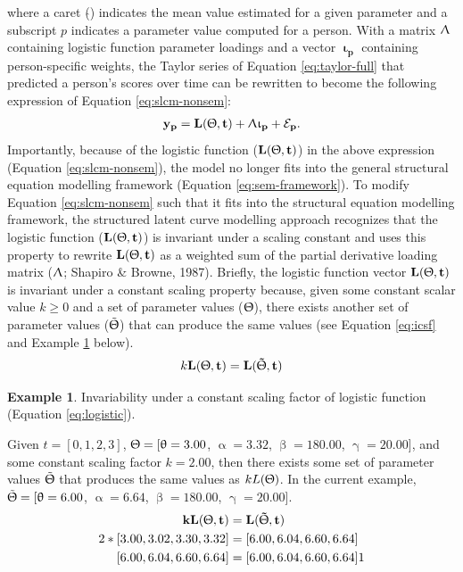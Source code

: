 \documentclass[
12pt, %
twoside,
english]{guelphthesis}
\theoremstyle{definition}
\theoremstyle{definition}
\newtheorem{example}{Example}[chapter]
\theoremstyle{definition}
\theoremstyle{definition}
\theoremstyle{remark}
\begin{document}
\noindent where a caret (\(\hat{}\)) indicates the mean value estimated
for a given parameter and a subscript \(p\) indicates a parameter value
computed for a person. With a matrix \(\mathbf{\Uplambda}\) containing
logistic function parameter loadings and a vector \(\mathbf{\upiota_p}\) containing
person-specific weights, the Taylor series of Equation
\ref{eq:taylor-full} that predicted a person's scores over time can be
rewritten to become the following expression of Equation
\ref{eq:slcm-nonsem}:
\begin{align}
 \mathbf{y_p} = \mathbf{L(\Uptheta, t)} + \mathbf{\Uplambda\upiota_p} + \mathbf{\mathcal{E}_p}.
 \label{eq:slcm-nonsem}
\end{align}
\noindent Importantly, because of the logistic function (\(\mathbf{L(\Uptheta, t)}\)) in the
above expression (Equation \ref{eq:slcm-nonsem}), the model no longer
fits into the general structural equation modelling framework (Equation \ref{eq:sem-framework}). To modify Equation \ref{eq:slcm-nonsem} such that it fits into the structural equation modelling framework, the structured latent curve modelling approach recognizes that the logistic function (\(\mathbf{L(\Uptheta, t)}\)) is invariant under a scaling constant and uses this property to rewrite \(\mathbf{L(\Uptheta, t)}\) as a weighted sum of the partial derivative loading matrix (\(\mathbf{\Uplambda}\); Shapiro \& Browne, 1987). Briefly, the
logistic function vector \(\mathbf{L(\Uptheta, t)}\) is invariant under a constant scaling
property because, given some constant scalar value \(k \ge 0\) and a set
of parameter values (\(\Uptheta\)), there exists another set of parameter
values (\(\tilde{\Uptheta}\)) that can produce the same values (see
Equation \ref{eq:icsf} and Example \ref{exm:icsf-ex} below).
\begin{align}
 k\mathbf{L(\Uptheta, t)} = \mathbf{L(\tilde{\Uptheta}, t)}
 \label{eq:icsf}
\end{align}
\begin{example}
\protect\hypertarget{exm:icsf-ex}{}\label{exm:icsf-ex}Invariability under a constant scaling factor of logistic function (Equation \ref{eq:logistic}).

\noindent \textup{Given $t = [0, 1, 2, 3]$, $\Uptheta = [\uptheta = 3.00$, $\upalpha = 3.32$, $\upbeta = 180.00$, $\upgamma = 20.00$], and some constant scaling factor $k = 2.00$, then there exists some set of parameter values $\tilde{\Uptheta}$ that produces the same values as $kL(\Uptheta)$. In the current example, $\tilde{\Uptheta} = [\uptheta = 6.00$, $\upalpha = 6.64$, $\upbeta = 180.00$, $\upgamma = 20.00$].}
\begin{align*}
\mathbf{kL(\Uptheta, t)} &= \mathbf{L(\tilde{\Uptheta}, t)} \nonumber \\ 
2*[3.00, 3.02, 3.30, 3.32] &=  [6.00, 6.04, 6.60, 6.64] \nonumber \\ 
[6.00, 6.04, 6.60, 6.64]  &= [6.00, 6.04, 6.60, 6.64] 1 \nonumber \\ 
\end{align*}
\vspace*{-25mm}

\noindent \hrulefill
\end{example}
\end{document}
